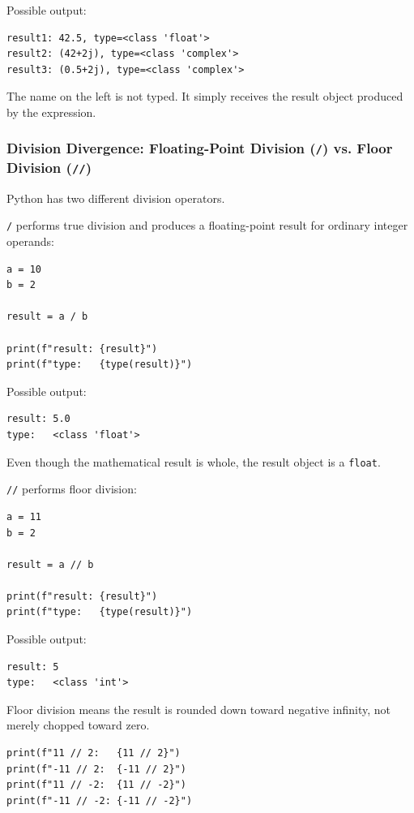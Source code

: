 Possible output:

\begin{verbatim}
result1: 42.5, type=<class 'float'>
result2: (42+2j), type=<class 'complex'>
result3: (0.5+2j), type=<class 'complex'>
\end{verbatim}

The name on the left is not typed. It simply receives the result object produced by the expression.

\subsubsection{Division Divergence: Floating-Point Division (\texttt{/}) vs. Floor Division (\texttt{//})}

Python has two different division operators.

\texttt{/} performs true division and produces a floating-point result for ordinary integer operands:

\begin{verbatim}
a = 10
b = 2

result = a / b

print(f"result: {result}")
print(f"type:   {type(result)}")
\end{verbatim}

Possible output:

\begin{verbatim}
result: 5.0
type:   <class 'float'>
\end{verbatim}

Even though the mathematical result is whole, the result object is a \texttt{float}.

\texttt{//} performs floor division:

\begin{verbatim}
a = 11
b = 2

result = a // b

print(f"result: {result}")
print(f"type:   {type(result)}")
\end{verbatim}

Possible output:

\begin{verbatim}
result: 5
type:   <class 'int'>
\end{verbatim}

Floor division means the result is rounded down toward negative infinity, not merely chopped toward zero.

\begin{verbatim}
print(f"11 // 2:   {11 // 2}")
print(f"-11 // 2:  {-11 // 2}")
print(f"11 // -2:  {11 // -2}")
print(f"-11 // -2: {-11 // -2}")
\end{verbatim}

